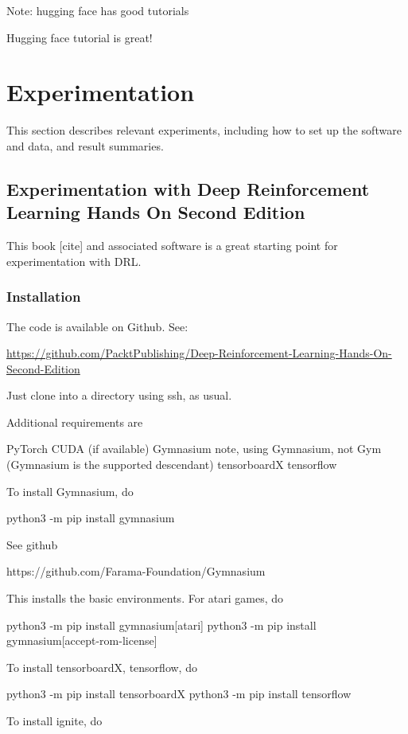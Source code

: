\documentclass[acmlarge,screen]{acmart}
\begin{document}
Note:  hugging face has good tutorials

Hugging face tutorial is great!





\section{Experimentation}

This section describes relevant experiments, including how to set up the software and data, and result summaries.

\subsection{Experimentation with Deep Reinforcement Learning Hands On Second Edition}

This book [cite] and associated software is a great starting point for experimentation with DRL.

\subsubsection{Installation}

The code is available on Github.  See:

\noindent \url{https://github.com/PacktPublishing/Deep-Reinforcement-Learning-Hands-On-Second-Edition}

Just clone into a directory using ssh, as usual.

Additional requirements are

PyTorch
CUDA (if available)
Gymnasium
note, using Gymnasium, not Gym (Gymnasium is the supported descendant)
tensorboardX
tensorflow

To install Gymnasium, do

python3 -m pip install gymnasium

See github

https://github.com/Farama-Foundation/Gymnasium

This installs the basic environments.  For atari games, do

python3 -m pip install gymnasium[atari]
python3 -m pip install gymnasium[accept-rom-license]



To install tensorboardX, tensorflow, do

python3 -m pip install tensorboardX
python3 -m pip install tensorflow

To install ignite, do
\end{document}
